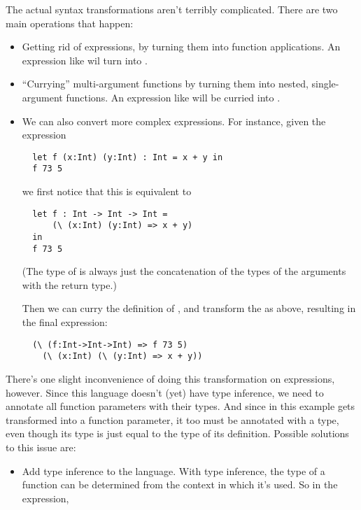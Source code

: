 \documentclass[pageno]{jpaper}
\begin{document}
{{{The actual syntax transformations aren't terribly complicated.
There are two main operations that happen:
\begin{itemize}
\item Getting rid of  expressions, by turning them into function applications.
An expression like  wil turn into .
\item ``Currying'' multi-argument functions by turning them into nested, single-argument functions.
An expression like  will be curried into
.
\item We can also convert more complex  expressions.
For instance, given the expression 

\begin{lstlisting}
  let f (x:Int) (y:Int) : Int = x + y in
  f 73 5 
\end{lstlisting}
 
we first notice that this is equivalent to

\begin{lstlisting}
  let f : Int -> Int -> Int =
      (\ (x:Int) (y:Int) => x + y)
  in
  f 73 5
\end{lstlisting}

(The type of  is always just the concatenation of the types of the arguments with the return type.)

Then we can curry the definition of , and transform the  as above, resulting in
the final expression:

\begin{lstlisting}
  (\ (f:Int->Int->Int) => f 73 5)
    (\ (x:Int) (\ (y:Int) => x + y))
\end{lstlisting}
\end{itemize}

There's one slight inconvenience of doing this transformation on  expressions, however.
Since this language doesn't (yet) have type inference, we need to annotate all function parameters
with their types. And since  in this example gets transformed into a function parameter,
it too must be annotated with a type, even though its type is just equal to the type of its definition.
Possible solutions to this issue are:

\begin{itemize}
\item Add type inference to the language. With type inference, the type of a function
can be determined from the context in which it's used. So in the expression,


\end{itemize}}}}
\end{document}
